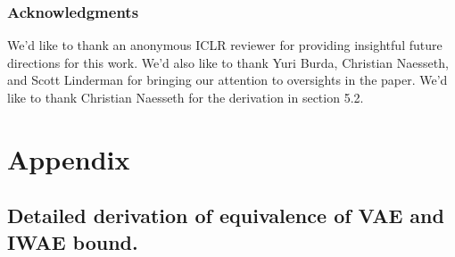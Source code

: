 \documentclass{article} %
\begin{document}
\subsubsection*{Acknowledgments}

We'd like to thank an anonymous ICLR reviewer for providing insightful future directions for this work. We'd also like to thank Yuri Burda, Christian Naesseth, and Scott Linderman for bringing our attention to oversights in the paper. We'd like to thank Christian Naesseth for the derivation in section 5.2.




\newpage

\section{Appendix}

\subsection{Detailed derivation of equivalence of VAE and IWAE bound.}
\label{detailed_derivation}
\end{document}
